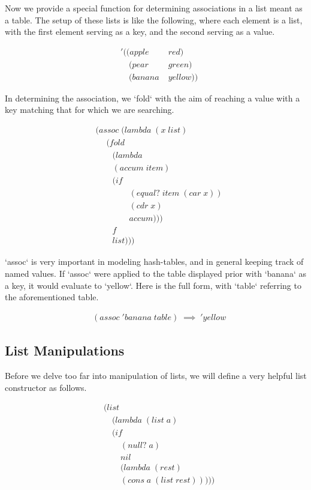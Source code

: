 \documentclass[11pt]{article}
\begin{document}
Now we provide a special function for determining associations in a list meant as a table. The setup of these lists is like the following, where each element is a list, with the first element serving as a key, and the second serving as a value.

\begin{align*}
& '((apple \; &red)
\\& \quad (pear \; &green)
\\& \quad (banana \; &yellow))
\end{align*}

In determining the association, we `fold` with the aim of reaching a value with a key matching that for which we are searching.

\begin{align*}
& (assoc \; (lambda \; (x \; list)
\\& \quad \; (fold \; 
\\& \qquad (lambda \; 
\\& \qquad (accum \; item) \; 
\\& \qquad (if \; 
\\& \qquad \qquad (equal? \; item \; (car \; x))
\\& \qquad \qquad (cdr \; x)
\\& \qquad \qquad accum)))
\\& \qquad f
\\& \qquad list)))
\end{align*}

`assoc` is very important in modeling hash-tables, and in general keeping track of named values. If `assoc` were applied to the table displayed prior with `banana` as a key, it would evaluate to `yellow`. Here is the full form, with `table` referring to the aforementioned table.

\begin{align*}
& (assoc \; 'banana \; table) \; \implies \; 'yellow
\end{align*}

\subsection{List Manipulations}
Before we delve too far into manipulation of lists, we will define a very helpful list constructor as follows.

\begin{align*}
& (list \; 
\\& \quad (lambda \; (list \; a) \; 
\\& \quad (if
\\& \qquad (null? \; a)
\\& \qquad nil
\\& \qquad (lambda \; (rest)
\\& \qquad (cons \; a \; (list \; rest)))))
\end{align*}
\end{document}
